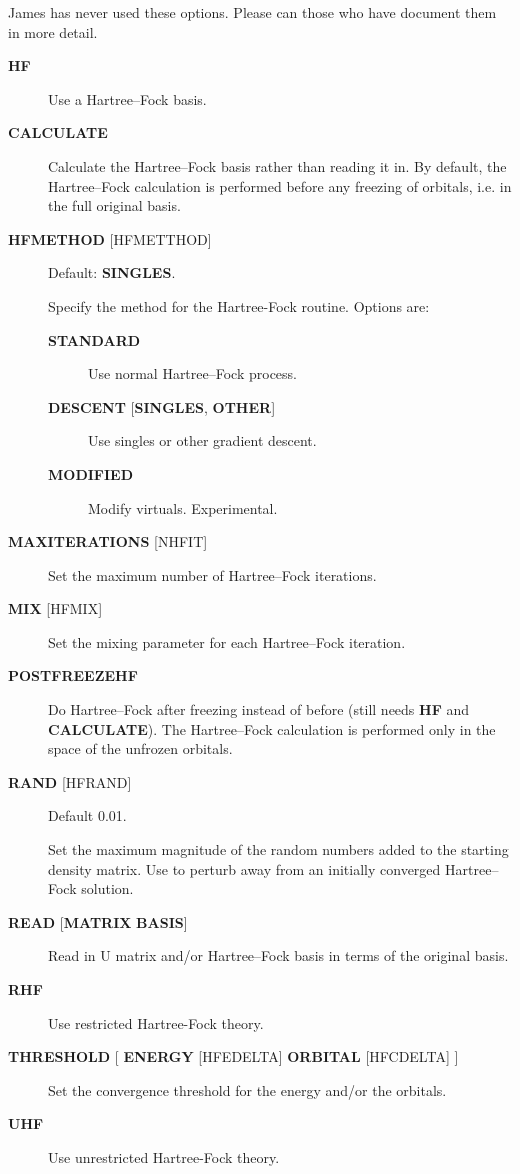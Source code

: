 \documentclass[openany,a4paper,10pt]{manual}
\begin{document}
\begin{notice}[note]
James has never used these options.  Please can those who have document them in more detail.
\end{notice}
\begin{description}
\item[\textbf{HF}]
Use a Hartree--Fock basis.

\item[\textbf{CALCULATE}]
Calculate the Hartree--Fock basis rather than reading it in.  By default,
the Hartree--Fock calculation is performed before any freezing of orbitals,
i.e. in the full original basis.

\item[\textbf{HFMETHOD} {[}HFMETTHOD{]}]
Default: \textbf{SINGLES}.

Specify the method for the Hartree-Fock routine.  Options are:
\begin{description}
\item[\textbf{STANDARD}]
Use normal Hartree--Fock process.

\item[\textbf{DESCENT} {[}\textbf{SINGLES}, \textbf{OTHER}{]}]
Use singles or other gradient descent.

\item[\textbf{MODIFIED}]
Modify virtuals.  Experimental.

\end{description}

\item[\textbf{MAXITERATIONS} {[}NHFIT{]}]
Set the maximum number of Hartree--Fock iterations.

\item[\textbf{MIX} {[}HFMIX{]}]
Set the mixing parameter for each Hartree--Fock iteration.

\item[\textbf{POSTFREEZEHF}]
Do Hartree--Fock after freezing instead of before (still needs \textbf{HF}
and \textbf{CALCULATE}).  The Hartree--Fock calculation is performed only
in the space of the unfrozen orbitals.

\item[\textbf{RAND} {[}HFRAND{]}]
Default 0.01.

Set the maximum magnitude of the random numbers added to the starting density matrix.
Use to perturb away from an initially converged Hartree--Fock solution.

\item[\textbf{READ} {[}\textbf{MATRIX} \textbf{BASIS}{]}]
Read in U matrix and/or Hartree--Fock basis in terms of the original basis.

\item[\textbf{RHF}]
Use restricted Hartree-Fock theory.

\item[\textbf{THRESHOLD} {[} \textbf{ENERGY} {[}HFEDELTA{]} \textbf{ORBITAL} {[}HFCDELTA{]} {]}]
Set the convergence threshold for the energy and/or the orbitals.

\item[\textbf{UHF}]
Use unrestricted Hartree-Fock theory.

\end{description}
\end{document}
